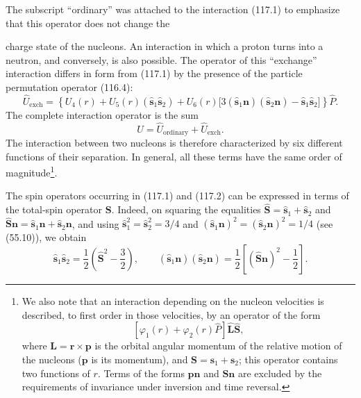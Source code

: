 The subscript ``ordinary'' was attached to the interaction (117.1) to
emphasize that this operator does not change the

charge state of the nucleons. An interaction in which a proton turns into a
neutron, and conversely, is also possible. The operator of this ``exchange''
interaction differs in form from (117.1) by the presence of the particle
permutation operator (116.4):
\begin{equation}
 \hat U_{\text{exch}}=\left\{U_4(r)+U_5(r)
 (\hat{\mathbf s}_1\hat{\mathbf s}_2)+U_6(r)
 \bigl[3(\hat{\mathbf s}_1\mathbf n)(\hat{\mathbf s}_2\mathbf n)
 -\hat{\mathbf s}_1\hat{\mathbf s}_2\bigr]\right\}\hat P.
 \tag{117.2}
\end{equation}
The complete interaction operator is the sum
\begin{equation}
 \hat U=\hat U_{\text{ordinary}}+\hat U_{\text{exch}}.
 \tag{117.3}
\end{equation}
The interaction between two nucleons is therefore characterized by six
different functions of their separation. In general, all these terms have the
same order of magnitude\footnote{We also note that an interaction depending
on the nucleon velocities is described, to first order in those velocities,
by an operator of the form
\[
 [\varphi_1(r)+\varphi_2(r)\hat P]\hat{\mathbf L}\hat{\mathbf S},
\]
where $\mathbf L=\mathbf r\times\mathbf p$ is the orbital angular momentum of
the relative motion of the nucleons ($\mathbf p$ is its momentum), and
$\mathbf S=\mathbf s_1+\mathbf s_2$; this operator contains two functions of
$r$. Terms of the forms $\mathbf p\mathbf n$ and $\mathbf S\mathbf n$ are
excluded by the requirements of invariance under inversion and time
reversal.}.

The spin operators occurring in (117.1) and (117.2) can be expressed in terms
of the total-spin operator $\mathbf S$. Indeed, on squaring the equalities
$\hat{\mathbf S}=\hat{\mathbf s}_1+\hat{\mathbf s}_2$ and
$\hat{\mathbf S}\mathbf n=\hat{\mathbf s}_1\mathbf n+
\hat{\mathbf s}_2\mathbf n$, and using
$\hat{\mathbf s}_1^2=\hat{\mathbf s}_2^2=3/4$ and
$(\hat{\mathbf s}_1\mathbf n)^2=(\hat{\mathbf s}_2\mathbf n)^2=1/4$
(see (55.10)), we obtain
\begin{equation}
 \hat{\mathbf s}_1\hat{\mathbf s}_2
 =\frac12\left(\hat{\mathbf S}^2-\frac32\right),\qquad
 (\hat{\mathbf s}_1\mathbf n)(\hat{\mathbf s}_2\mathbf n)
 =\frac12\left[(\hat{\mathbf S}\mathbf n)^2-\frac12\right].
 \tag{117.4}
\end{equation}

